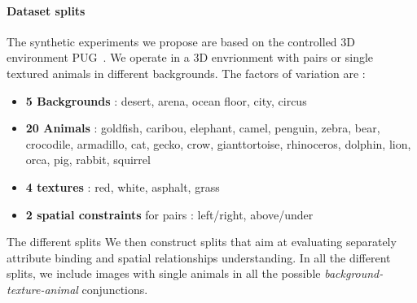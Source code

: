 \paragraph{Dataset splits} The synthetic experiments we propose are based on  the controlled 3D environment  PUG~\citep{bordes2023pugphotorealisticsemanticallycontrollable}. We operate in a 3D envrionment with pairs or single textured animals in different backgrounds. The factors of variation are :
\begin{itemize}
    \item \textbf{5 Backgrounds} : desert, arena, ocean floor, city, circus
    \item \textbf{20  Animals}  : goldfish, caribou, elephant, camel, penguin, zebra,
        bear, crocodile, armadillo, cat, gecko, crow,
        gianttortoise, rhinoceros, dolphin, lion, orca, pig,
        rabbit, squirrel
    \item \textbf{4 textures} : red, white, asphalt, grass
    \item \textbf{2 spatial constraints} for pairs : left/right, above/under
\end{itemize}
The different splits 
We then construct splits that aim at evaluating separately attribute binding and spatial relationships understanding. In all the different splits, we include images with single animals in all the possible \emph{background-texture-animal} conjunctions.
